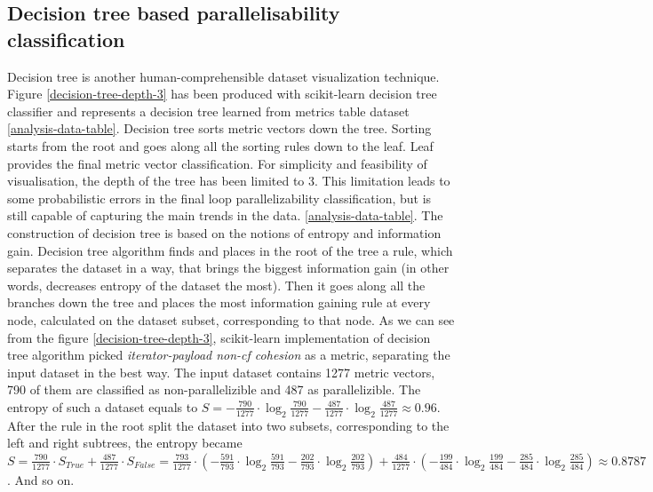 \subsection{Decision tree based parallelisability classification}
\label{analysis-decision-tree}
\qquad Decision tree is another human-comprehensible dataset visualization technique. Figure \ref{decision-tree-depth-3} has been produced with scikit-learn \cite{python-lib-scikit-learn} decision tree classifier and represents a decision tree learned from metrics table dataset \ref{analysis-data-table}. Decision tree sorts metric vectors down the tree. Sorting starts from the root and goes along all the sorting rules down to the leaf. Leaf provides the final metric vector classification. For simplicity and feasibility of visualisation, the depth of the tree has been limited to 3. This limitation leads to some probabilistic errors in the final loop parallelizability classification, but is still capable of capturing the main trends in the data. \ref{analysis-data-table}.\newline
\null\qquad The construction of decision tree is based on the notions of entropy and information gain. Decision tree algorithm finds and places in the root of the tree a rule, which separates the dataset in a way, that brings the biggest information gain (in other words, decreases entropy of the dataset the most). Then it goes along all the branches down the tree and places the most information gaining rule at every node, calculated on the dataset subset, corresponding to that node.\newline
\null\qquad As we can see from the figure \ref{decision-tree-depth-3}, scikit-learn implementation of decision tree algorithm picked \textit{iterator-payload non-cf cohesion} as a metric, separating the input dataset in the best way. The input dataset contains 1277 metric vectors, 790 of them are classified as non-parallelizible and 487 as parallelizible. The entropy of such a dataset equals to $S=-\frac{790}{1277}\cdot \log_{2}\frac{790}{1277}-\frac{487}{1277}\cdot \log_{2}\frac{487}{1277}\approx 0.96$. After the rule in the root split the dataset into two subsets, corresponding to the left and right subtrees, the entropy became $S=\frac{790}{1277}\cdot S_{True} + \frac{487}{1277}\cdot S_{False} = \frac{793}{1277}\cdot (-\frac{591}{793}\cdot \log_{2}\frac{591}{793}-\frac{202}{793}\cdot \log_{2}\frac{202}{793}) + \frac{484}{1277}\cdot (-\frac{199}{484}\cdot \log_{2}\frac{199}{484}-\frac{285}{484}\cdot \log_{2}\frac{285}{484})\approx 0.8787 $. And so on.\newline

